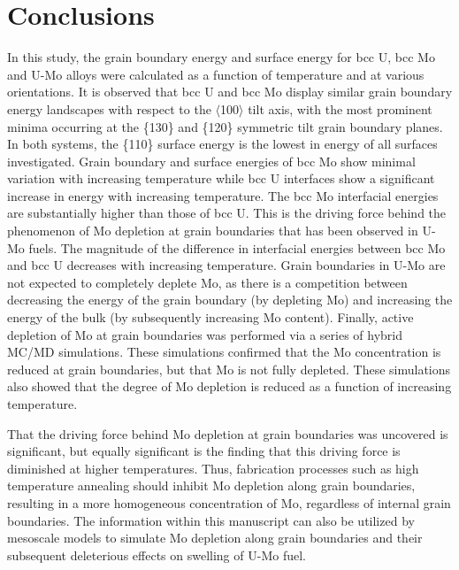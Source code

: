 \documentclass[review]{elsarticle}
\begin{document}
\FloatBarrier

\section{Conclusions}

In this study, the grain boundary energy and surface energy for bcc U, bcc Mo and U-Mo alloys were calculated as a function of temperature and at various orientations. It is observed that bcc U and bcc Mo display similar grain boundary energy landscapes with respect to the $\langle$100$\rangle$ tilt axis, with the most prominent minima occurring at the \{130\} and \{120\} symmetric tilt grain boundary planes. In both systems, the \{110\} surface energy is the lowest in energy of all surfaces investigated. Grain boundary and surface energies of bcc Mo show minimal variation with increasing temperature while bcc U interfaces show a significant increase in energy with increasing temperature. The bcc Mo interfacial energies are substantially higher than those of bcc U. This is the driving force behind the phenomenon of Mo depletion at grain boundaries that has been observed in U-Mo fuels. The magnitude of the difference in interfacial energies between bcc Mo and bcc U decreases with increasing temperature. Grain boundaries in U-Mo are not expected to completely deplete Mo, as there is a competition between decreasing the energy of the grain boundary (by depleting Mo) and increasing the energy of the bulk (by subsequently increasing Mo content). Finally, active depletion of Mo at grain boundaries was performed via a series of hybrid MC/MD simulations. These simulations confirmed that the Mo concentration is reduced at grain boundaries, but that Mo is not fully depleted. These simulations also showed that the degree of Mo depletion is reduced as a function of increasing temperature. 

That the driving force behind Mo depletion at grain boundaries was uncovered is significant, but equally significant is the finding that this driving force is diminished at higher temperatures. Thus, fabrication processes such as high temperature annealing should inhibit Mo depletion along grain boundaries, resulting in a more homogeneous concentration of Mo, regardless of internal grain boundaries. The information within this manuscript can also be utilized by mesoscale models to simulate Mo depletion along grain boundaries and their subsequent deleterious effects on swelling of U-Mo fuel.
\end{document}

